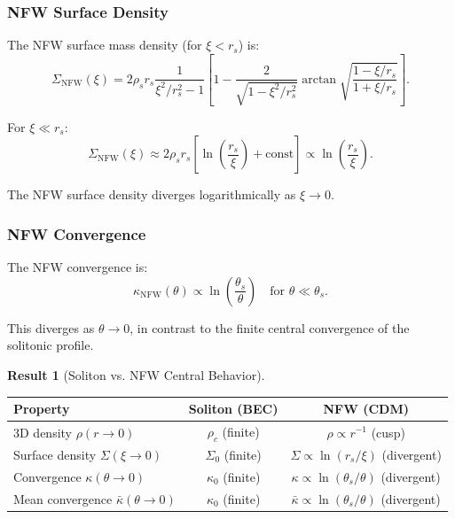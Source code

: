 \documentclass[11pt,a4paper]{article}
\theoremstyle{definition}
\newtheorem{result}{Result}[section]
\theoremstyle{remark}
\begin{document}
\subsubsection{NFW Surface Density}

The NFW surface mass density (for $\xi < r_s$) is:
\begin{equation}
\Sigma_{\mathrm{NFW}}(\xi) = 2\rho_s r_s \frac{1}{\xi^2/r_s^2 - 1} \left[1 - \frac{2}{\sqrt{1 - \xi^2/r_s^2}}\arctan\sqrt{\frac{1 - \xi/r_s}{1 + \xi/r_s}}\right].
\end{equation}

For $\xi \ll r_s$:
\begin{equation}
\Sigma_{\mathrm{NFW}}(\xi) \approx 2\rho_s r_s \left[\ln\left(\frac{r_s}{\xi}\right) + \text{const}\right] \propto \ln\left(\frac{r_s}{\xi}\right).
\end{equation}

The NFW surface density diverges logarithmically as $\xi \to 0$.

\subsubsection{NFW Convergence}

The NFW convergence is:
\begin{equation}
\kappa_{\mathrm{NFW}}(\theta) \propto \ln\left(\frac{\theta_s}{\theta}\right) \quad \text{for } \theta \ll \theta_s.
\end{equation}

This diverges as $\theta \to 0$, in contrast to the finite central convergence of the solitonic profile.

\begin{result}[Soliton vs. NFW Central Behavior]
\begin{center}
\begin{tabular}{@{}lcc@{}}
\toprule
\textbf{Property} & \textbf{Soliton (BEC)} & \textbf{NFW (CDM)} \\
\midrule
3D density $\rho(r \to 0)$ & $\rho_c$ (finite) & $\rho \propto r^{-1}$ (cusp) \\
Surface density $\Sigma(\xi \to 0)$ & $\Sigma_0$ (finite) & $\Sigma \propto \ln(r_s/\xi)$ (divergent) \\
Convergence $\kappa(\theta \to 0)$ & $\kappa_0$ (finite) & $\kappa \propto \ln(\theta_s/\theta)$ (divergent) \\
Mean convergence $\bar{\kappa}(\theta \to 0)$ & $\kappa_0$ (finite) & $\bar{\kappa} \propto \ln(\theta_s/\theta)$ (divergent) \\
\bottomrule
\end{tabular}
\end{center}
\end{result}
\end{document}

